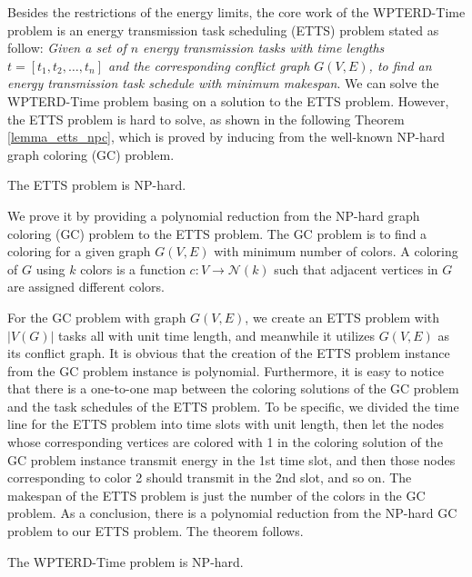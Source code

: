 \documentclass[journal,10pt]{IEEEtran}
\begin{document}
Besides the restrictions of the energy limits, the core work of the WPTERD-Time problem is an energy transmission task scheduling (ETTS) problem stated as follow: \textit{Given a set of $n$ energy transmission tasks with time lengths $t{=}[t_1,t_2,\ldots,t_n]$ and the corresponding conflict graph $G(V,E)$, to find an energy transmission task schedule with minimum makespan}. We can solve the WPTERD-Time problem basing on a solution to the ETTS problem. However, the ETTS problem is hard to solve, as shown in the following Theorem \ref{lemma_etts_npc}, which is proved by inducing from the well-known NP-hard graph coloring (GC) problem.

\begin{theorem}
\label{lemma_etts_npc}
The ETTS problem is NP-hard.
\end{theorem}

\begin{IEEEproof}
We prove it by providing a polynomial reduction from the NP-hard graph coloring (GC) problem to the ETTS problem. The GC problem is to find a coloring for a given graph $G(V,E)$ with minimum number of colors. A coloring of $G$ using $k$ colors is a function $c{:}V{\rightarrow}\mathcal{N}(k)$ such that adjacent vertices in $G$ are assigned different colors.

For the GC problem with graph $G(V,E)$, we create an ETTS problem with $|V(G)|$ tasks all with unit time length, and meanwhile it utilizes $G(V,E)$ as its conflict graph. It is obvious that the creation of the ETTS problem instance from the GC problem instance is polynomial. Furthermore, it is easy to notice that there is a one-to-one map between the coloring solutions of the GC problem and the task schedules of the ETTS problem. To be specific, we divided the time line for the ETTS problem into time slots with unit length, then let the nodes whose corresponding vertices are colored with 1 in the coloring solution of the GC problem instance transmit energy in the 1st time slot, and then those nodes corresponding to color 2 should transmit in the 2nd slot, and so on. The makespan of the ETTS problem is just the number of the colors in the GC problem. As a conclusion, there is a polynomial reduction from the NP-hard GC problem to our ETTS problem. The theorem follows.
\end{IEEEproof}

\begin{theorem}
\label{lemma_wpterd_time_npc}
The WPTERD-Time problem is NP-hard.
\end{theorem}
\end{document}
